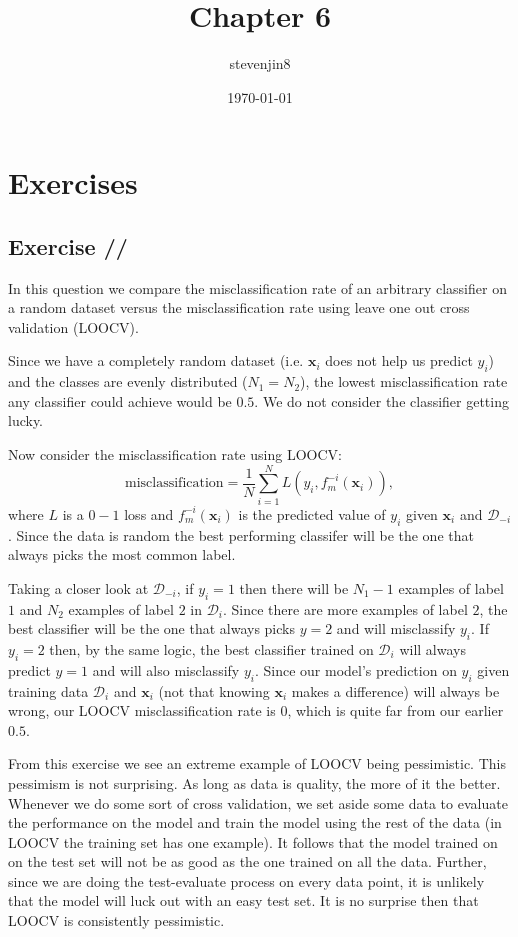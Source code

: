 \documentclass[a4paper,11pt]{article}
\title{Chapter 6}
\author{stevenjin8}
\date{\today}
\newcounter{exercise}
\newcounter{subexercise}
\newcommand*{\exercise}[1][]{\subsection*{Exercise \ifx/#1/\stepcounter{exercise}\arabic{exercise}\else#1\fi}\setcounter{subexercise}{0}}
\begin{document}
\maketitle
\section*{Exercises}
\exercise
In this question we compare the misclassification rate of an arbitrary classifier
on a random dataset versus the misclassification rate using leave one out cross
validation (LOOCV).

Since we have a completely random dataset (i.e. $\mathbf{x}_i$ does not help
us predict $y_i$) and the classes are evenly distributed ($N_1 = N_2$),
the lowest misclassification rate any classifier could achieve would be
$0.5$. We do not consider the classifier getting lucky.

Now consider the misclassification rate using LOOCV:
\[
	\text{misclassification} = \frac1N\sum\limits_{i=1}^{N} L(y_i, f_m^{-i}(\mathbf{x}_i)),
\]
where $L$ is a $0-1$ loss and $f_m^{-i}(\mathbf{x}_i)$ is the predicted value
of $y_i$ given $\mathbf{x}_i$ and $\mathcal{D}_{-i}$. Since the data is random
the best performing classifer will be the one that always picks the most common
label.

Taking a closer look at $\mathcal{D}_{-i}$, if $y_i=1$ then there will be
$N_1-1$ examples of label $1$ and $N_2$ examples of label $2$ in $\mathcal{D}_i$. Since there
are more examples of label $2$, the best classifier will be the one that always
picks $y=2$ and will misclassify $y_i$. If $y_i=2$ then, by the same logic,
the best classifier trained on
$\mathcal{D}_i$ will always predict $y=1$ and will also misclassify $y_i$.
Since our model's prediction on $y_i$ given training data $\mathcal{D}_i$ and
$\mathbf{x}_i$ (not that knowing $\mathbf{x}_i$ makes a difference) will always be 
wrong, our LOOCV misclassification rate is 0, which is quite far from our 
earlier $0.5$.

From this exercise we see an extreme example of LOOCV being pessimistic. This
pessimism is not surprising. As long as data is quality, the more of it the
better. Whenever we do some sort of cross validation, we set aside some
data to evaluate the performance on the model and train the model using the rest
of the data (in LOOCV the training set has one example).
It follows that the model trained on on the test
set will not be as good as the one trained on all the data. Further, since we are
doing the test-evaluate process on every data point, it is unlikely that the model will
luck out with an easy test set. It is no surprise then that LOOCV is
consistently pessimistic.
\end{document}
